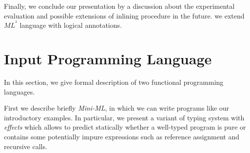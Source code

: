 \documentclass[a4paper,11pt,oneside]{article}
\theoremstyle{plain}
\newcommand{\inlsrc}{\textit{ML}^{^2}}
\begin{document}
 Finally, we conclude our presentation by a discussion about the experimental evaluation and possible extensions of inlining procedure in the future.
we extend $\inlsrc$ language with logical annotations.  
 
 
%






%
%
% 

%
%
%
%



\newpage
\section{Input Programming Language }

	In this section, we give formal description of two functional programming languages. 
	
	First we describe briefly \textit{Mini-ML}, in which we can write programs like our introductory examples.
	In particular, we present a variant of typing system with \textit{effects} which allows to predict statically whether a well-typed program is pure or contains some potentially impure expressions such as reference assignment and recursive calls.  
	
\end{document}
